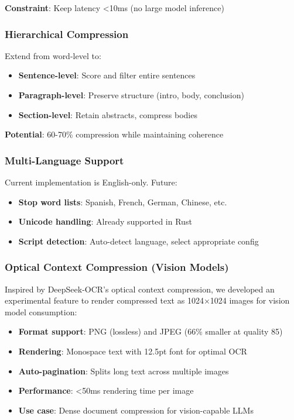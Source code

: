 \textbf{Constraint}: Keep latency <10ms (no large model inference)

\subsubsection{Hierarchical Compression}

Extend from word-level to:

\begin{itemize}
    \item \textbf{Sentence-level}: Score and filter entire sentences
    \item \textbf{Paragraph-level}: Preserve structure (intro, body, conclusion)
    \item \textbf{Section-level}: Retain abstracts, compress bodies
\end{itemize}

\textbf{Potential}: 60-70\% compression while maintaining coherence

\subsubsection{Multi-Language Support}

Current implementation is English-only. Future:

\begin{itemize}
    \item \textbf{Stop word lists}: Spanish, French, German, Chinese, etc.
    \item \textbf{Unicode handling}: Already supported in Rust
    \item \textbf{Script detection}: Auto-detect language, select appropriate config
\end{itemize}

\subsubsection{Optical Context Compression (Vision Models)}

Inspired by DeepSeek-OCR's optical context compression, we developed an experimental feature to render compressed text as 1024×1024 images for vision model consumption:

\begin{itemize}
    \item \textbf{Format support}: PNG (lossless) and JPEG (66\% smaller at quality 85)
    \item \textbf{Rendering}: Monospace text with 12.5pt font for optimal OCR
    \item \textbf{Auto-pagination}: Splits long text across multiple images
    \item \textbf{Performance}: <50ms rendering time per image
    \item \textbf{Use case}: Dense document compression for vision-capable LLMs
\end{itemize}

